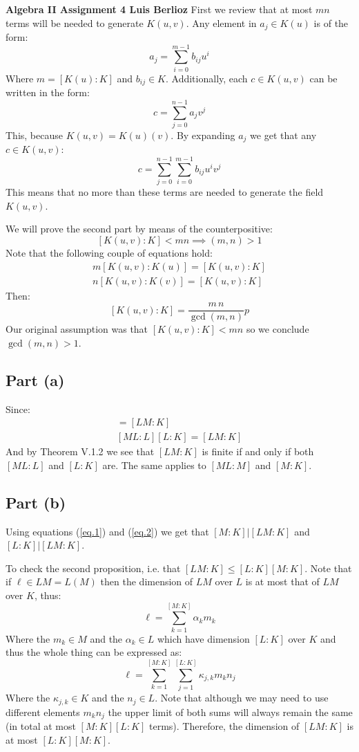 \noindent\textbf{Algebra II Assignment 4 \hspace{\fill} Luis Berlioz}
First we review that at most $mn$ terms will be needed to generate $K(u,v)$.
Any element in $a_j\in K(u)$ is of the form:
$$a_j = \sum_{i=0}^{m-1} b_{ij} u^i$$
Where $m=[K(u):K]$ and $b_{ij}\in K$. 
Additionally, each $c\in K(u,v)$ can be written in the form:
$$c= \sum_{j=0}^{n-1} a_{j} v^j$$
This, because $K(u,v)= K(u)(v)$. By expanding $a_j$ we get that any $c\in K(u,v)$:
$$c= \sum_{j=0}^{n-1} \sum_{i=0}^{m-1} b_{ij} u^i v^j$$
This means that no more than these terms are needed to generate the field $K(u,v)$.

We will prove the second part by means of the counterpositive: 
$$[K(u,v):K]<mn \implies (m,n)>1$$ 
Note that the following couple of equations hold:
\begin{gather*}
m[K(u,v):K(u)] = [K(u,v):K]\\
n[K(u,v):K(v)] = [K(u,v):K]
\end{gather*}
Then:
$$[K(u,v):K] = \frac{m\, n}{\gcd(m,n)}p$$
Our original assumption was that $[K(u,v):K]<mn$ so we conclude $\gcd(m,n)>1$. 

\subsection*{Part (a)}
Since:
\begin{gather} 
    [ML:M][M:K] = [LM:K]\label{eq.1}\\
    [ML:L][L:K] = [LM:K]\label{eq.2}
\end{gather}
And by Theorem V.1.2 we see that $[LM:K]$ is finite if and only if both $[ML:L]$ and $[L:K]$ are.
The same applies to $[ML:M]$ and $[M:K]$. 

\subsection*{Part (b)}
Using equations (\ref{eq.1}) and (\ref{eq.2}) we get that $[M:K]| [LM:K]$ and $[L:K]| [LM:K]$. 

To check the second proposition, i.e. that $[LM:K]\leq [L:K][M:K]$. Note that if $\ell \in LM = L(M)$ then the dimension of $LM$ over $L$ is at most that of $LM$ over $K$, thus:
$$\ell = \sum_{k=1}^{[M:K]}\alpha_k m_k$$
Where the  $m_k\in M$ and the $\alpha_k \in L$ which have dimension $[L:K]$ over $K$ and thus the whole thing can be expressed as:
$$\ell =  \sum_{k=1}^{[M:K]}\sum_{j=1}^{[L:K]}\kappa_{j,k}m_kn_j$$
Where the $\kappa_{j,k}\in K$ and the $n_j\in L$. 
Note that although we may need to use different elements $m_kn_j$ the upper limit of both sums will always remain the same (in total at most $[M:K][L:K]$ terms). 
Therefore, the dimension of $[LM:K]$ is at most $[L:K][M:K]$. 
